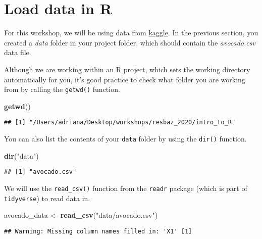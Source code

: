 \documentclass[]{book}
\newenvironment{Shaded}{\begin{snugshade}}{\end{snugshade}}
\newcommand{\KeywordTok}[1]{\textcolor[rgb]{0.13,0.29,0.53}{\textbf{#1}}}
\newcommand{\NormalTok}[1]{#1}
\newcommand{\StringTok}[1]{\textcolor[rgb]{0.31,0.60,0.02}{#1}}
\begin{document}
\hypertarget{load-data-in-r}{%
\section{Load data in R}\label{load-data-in-r}}

For this workshop, we will be using data from \href{https://www.kaggle.com/}{kaggle}. In the previous section, you created a \emph{data} folder in your project folder, which should contain the \emph{avocado.csv} data file.

Although we are working within an R project, which sets the working directory automatically for you, it's good practice to check what folder you are working from by calling the \texttt{getwd()} function.

\begin{Shaded}
\begin{Highlighting}[]
\KeywordTok{getwd}\NormalTok{()}
\end{Highlighting}
\end{Shaded}

\begin{verbatim}
## [1] "/Users/adriana/Desktop/workshops/resbaz_2020/intro_to_R"
\end{verbatim}

You can also list the contents of your \texttt{data} folder by using the \texttt{dir()} function.

\begin{Shaded}
\begin{Highlighting}[]
\KeywordTok{dir}\NormalTok{(}\StringTok{"data"}\NormalTok{)}
\end{Highlighting}
\end{Shaded}

\begin{verbatim}
## [1] "avocado.csv"
\end{verbatim}

We will use the \texttt{read\_csv()} function from the \texttt{readr} package (which is part of \texttt{tidyverse}) to read data in.

\begin{Shaded}
\begin{Highlighting}[]
\NormalTok{avocado_data <-}\StringTok{ }\KeywordTok{read_csv}\NormalTok{(}\StringTok{"data/avocado.csv"}\NormalTok{)}
\end{Highlighting}
\end{Shaded}

\begin{verbatim}
## Warning: Missing column names filled in: 'X1' [1]
\end{verbatim}
\end{document}
